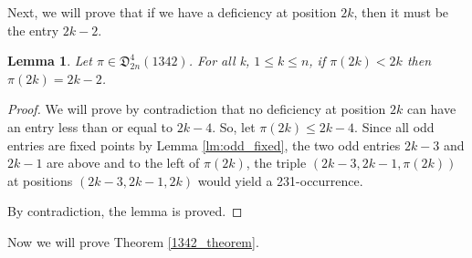 \documentclass[
final
]{dmtcs-episciences}
\newtheorem{lemma}[theorem]{Lemma}
\theoremstyle{definition}
\theoremstyle{remark}
\begin{document}
Next, we will prove that if we have a deficiency at position $2k$, then it must be the entry $2k-2$.


\begin{lemma}
\label{lm:def=2k-2}
Let $\pi \in \mathfrak{D}^4_{2n}(1342)$. For all k, $1 \le k \le n$, if $\pi(2k) < 2k$ then $\pi(2k) = 2k-2$.
\end{lemma}

\begin{proof}
We will prove by contradiction that no deficiency at position $2k$ can have an entry less than or equal to $2k-4$.  So, let $\pi(2k) \le 2k-4$.  Since all odd entries are fixed points by Lemma \ref{lm:odd_fixed}, the two odd entries $2k-3$ and $2k-1$ are above and to the left of $\pi(2k)$, the triple $(2k-3, 2k-1,\pi(2k))$ at positions $(2k-3,2k-1,2k)$ would yield a 231-occurrence. 

By contradiction, the lemma is proved.
\end{proof}

Now we will prove Theorem \ref {1342_theorem}.
\end{document}

